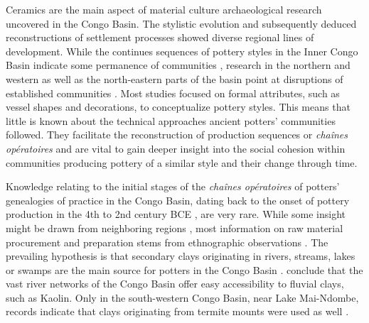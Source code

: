 \documentclass[preprint,10pt,oneside,onecolumn,authoryear]{elsarticle}
\begin{document}
Ceramics are the main aspect of material culture archaeological research uncovered in the Congo Basin. The stylistic evolution and subsequently deduced reconstructions of settlement processes showed diverse regional lines of development. While the continues sequences of pottery styles in the Inner Congo Basin indicate some permanence of communities \citep{Wotzka.1995}, research in the northern and western \citep{Seidensticker.2021e,Seidensticker.2024} as well as the north-eastern parts of the basin \citep{LivingstoneSmith.2017} point at disruptions of established communities \citep{Seidensticker.2021,Seidensticker.2021e,Seidensticker.2025}. Most studies focused on formal attributes, such as vessel shapes and decorations, to conceptualize pottery styles. This means that little is known about the technical approaches ancient potters' communities followed. They facilitate the reconstruction of production sequences or \textit{chaînes opératoires} and are vital to gain deeper insight into the social cohesion within communities producing pottery of a similar style and their change through time.

Knowledge relating to the initial stages of the \textit{chaînes opératoires} of potters' genealogies of practice \citep{Gosselain.2018} in the Congo Basin, dating back to the onset of pottery production in the 4th to 2nd century BCE \citep{Wotzka.1995}, are very rare. While some insight might be drawn from neighboring regions \citep{Mercader.2000,Tsoupra.2022,EpossiNtah.2024}, most information on raw material procurement and preparation stems from ethnographic observations \citep{Coart.1907,Maes.1937,Eggert.1980c,KanimbaMisago.1992a}. The prevailing hypothesis is that secondary clays originating in rivers, streams, lakes or swamps are the main source for potters in the Congo Basin \citep[18--19 Map~1]{Drost.1967}. \citet[31--32]{Coart.1907} conclude that the vast river networks of the Congo Basin offer easy accessibility to fluvial clays, such as Kaolin. Only in the south-western Congo Basin, near Lake Mai-Ndombe, records indicate that clays originating from termite mounts were used as well \citep[19--21 Map 1]{Drost.1967}.
 
\end{document}
